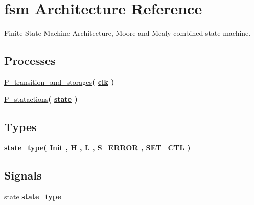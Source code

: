 \hypertarget{classstart__generator_1_1fsm}{}\section{fsm Architecture Reference}
\label{classstart__generator_1_1fsm}


Finite State Machine Architecture, Moore and Mealy combined state machine.  


\subsection*{Processes}
 \begin{DoxyCompactItemize}
\item 
\hyperlink{classstart__generator_1_1fsm_a99f8caf6038e841bdcf97ebb374b0de4}{P\+\_\+transition\+\_\+and\+\_\+storages}{\bfseries  ( {\bfseries {\bfseries \hyperlink{classstart__generator_a4a4609c199d30b3adebbeb3a01276ec5}{clk}} \textcolor{vhdlchar}{ }} )}
\item 
\hyperlink{classstart__generator_1_1fsm_a9ad00cfaa20b4e290a3d3ca73f332adb}{P\+\_\+statactions}{\bfseries  ( {\bfseries {\bfseries \hyperlink{classstart__generator_1_1fsm_ad5c908d9d78df85b2f0aa3b36b05c3a5}{state}} \textcolor{vhdlchar}{ }} )}
\end{DoxyCompactItemize}
\subsection*{Types}
 \begin{DoxyCompactItemize}
\item 
{\bfseries \hyperlink{classstart__generator_1_1fsm_a2699f3fb1f27a0f47ce4731bc1770ffb}{state\+\_\+type}{\bfseries \textcolor{vhdlchar}{(}\textcolor{vhdlchar}{ }\textcolor{vhdlchar}{Init}\textcolor{vhdlchar}{ }\textcolor{vhdlchar}{,}\textcolor{vhdlchar}{ }\textcolor{vhdlchar}{H}\textcolor{vhdlchar}{ }\textcolor{vhdlchar}{,}\textcolor{vhdlchar}{ }\textcolor{vhdlchar}{L}\textcolor{vhdlchar}{ }\textcolor{vhdlchar}{,}\textcolor{vhdlchar}{ }\textcolor{vhdlchar}{S\+\_\+\+E\+R\+R\+OR}\textcolor{vhdlchar}{ }\textcolor{vhdlchar}{,}\textcolor{vhdlchar}{ }\textcolor{vhdlchar}{S\+E\+T\+\_\+\+C\+TL}\textcolor{vhdlchar}{ }\textcolor{vhdlchar}{)}\textcolor{vhdlchar}{ }}} 
\end{DoxyCompactItemize}
\subsection*{Signals}
 \begin{DoxyCompactItemize}
\item 
\hyperlink{classstart__generator_1_1fsm_ad5c908d9d78df85b2f0aa3b36b05c3a5}{state} {\bfseries {\bfseries \hyperlink{classstart__generator_1_1fsm_a2699f3fb1f27a0f47ce4731bc1770ffb}{state\+\_\+type}} \textcolor{vhdlchar}{ }} 
\end{DoxyCompactItemize}



